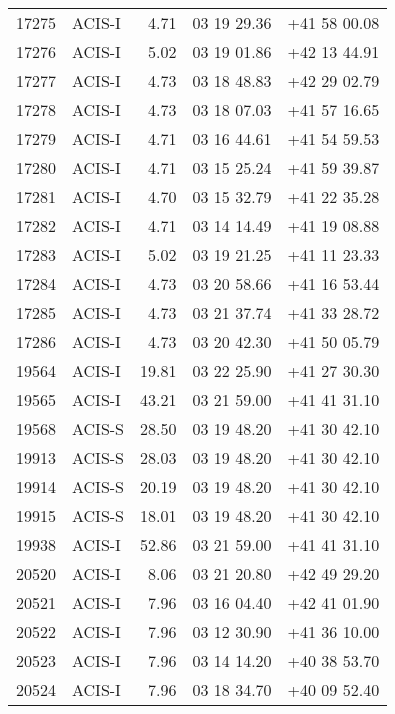 \begin{longtable}{rlrll}
  17275 &     ACIS-I &           4.71 & 03 19 29.36 & +41 58 00.08 \\
  17276 &     ACIS-I &           5.02 & 03 19 01.86 & +42 13 44.91 \\
  17277 &     ACIS-I &           4.73 & 03 18 48.83 & +42 29 02.79 \\
  17278 &     ACIS-I &           4.73 & 03 18 07.03 & +41 57 16.65 \\
  17279 &     ACIS-I &           4.71 & 03 16 44.61 & +41 54 59.53 \\
  17280 &     ACIS-I &           4.71 & 03 15 25.24 & +41 59 39.87 \\
  17281 &     ACIS-I &           4.70 & 03 15 32.79 & +41 22 35.28 \\
  17282 &     ACIS-I &           4.71 & 03 14 14.49 & +41 19 08.88 \\
  17283 &     ACIS-I &           5.02 & 03 19 21.25 & +41 11 23.33 \\
  17284 &     ACIS-I &           4.73 & 03 20 58.66 & +41 16 53.44 \\
  17285 &     ACIS-I &           4.73 & 03 21 37.74 & +41 33 28.72 \\
  17286 &     ACIS-I &           4.73 & 03 20 42.30 & +41 50 05.79 \\
  19564 &     ACIS-I &          19.81 & 03 22 25.90 & +41 27 30.30 \\
  19565 &     ACIS-I &          43.21 & 03 21 59.00 & +41 41 31.10 \\
  19568 &     ACIS-S &          28.50 & 03 19 48.20 & +41 30 42.10 \\
  19913 &     ACIS-S &          28.03 & 03 19 48.20 & +41 30 42.10 \\
  19914 &     ACIS-S &          20.19 & 03 19 48.20 & +41 30 42.10 \\
  19915 &     ACIS-S &          18.01 & 03 19 48.20 & +41 30 42.10 \\
  19938 &     ACIS-I &          52.86 & 03 21 59.00 & +41 41 31.10 \\
  20520 &     ACIS-I &           8.06 & 03 21 20.80 & +42 49 29.20 \\
  20521 &     ACIS-I &           7.96 & 03 16 04.40 & +42 41 01.90 \\
  20522 &     ACIS-I &           7.96 & 03 12 30.90 & +41 36 10.00 \\
  20523 &     ACIS-I &           7.96 & 03 14 14.20 & +40 38 53.70 \\
  20524 &     ACIS-I &           7.96 & 03 18 34.70 & +40 09 52.40 \\

\end{longtable}

